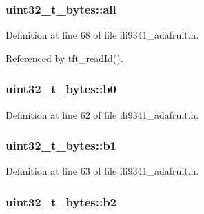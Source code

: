 \subsubsection[{\texorpdfstring{all}{all}}]{ uint32\+\_\+t\+\_\+bytes\+::all}\hypertarget{unionuint32__t__bytes_a83b0c87830b60d185365dbadf8efd4a0}{}\label{unionuint32__t__bytes_a83b0c87830b60d185365dbadf8efd4a0}


Definition at line 68 of file ili9341\+\_\+adafruit.\+h.



Referenced by tft\+\_\+read\+Id().

\subsubsection[{\texorpdfstring{b0}{b0}}]{ uint32\+\_\+t\+\_\+bytes\+::b0}\hypertarget{unionuint32__t__bytes_a92b86537decb69327191d870f41c60f7}{}\label{unionuint32__t__bytes_a92b86537decb69327191d870f41c60f7}


Definition at line 62 of file ili9341\+\_\+adafruit.\+h.

\subsubsection[{\texorpdfstring{b1}{b1}}]{ uint32\+\_\+t\+\_\+bytes\+::b1}\hypertarget{unionuint32__t__bytes_a91fb31482a2ce44b454fca964dcd556b}{}\label{unionuint32__t__bytes_a91fb31482a2ce44b454fca964dcd556b}


Definition at line 63 of file ili9341\+\_\+adafruit.\+h.

\subsubsection[{\texorpdfstring{b2}{b2}}]{ uint32\+\_\+t\+\_\+bytes\+::b2}\hypertarget{unionuint32__t__bytes_a462312b99de0c6d1c497064902196e1d}{}\label{unionuint32__t__bytes_a462312b99de0c6d1c497064902196e1d}


